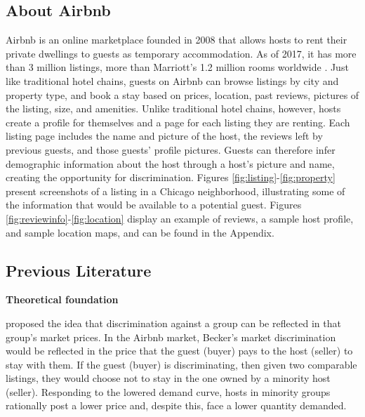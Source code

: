 \subsection{About Airbnb} 
\label{about}
Airbnb is an online marketplace founded in 2008 that allows hosts to rent their private dwellings to guests as temporary accommodation. As of 2017, it has more than 3 million listings, more than Marriott's 1.2 million rooms worldwide \citep{aboutus}. Just like traditional hotel chains, guests on Airbnb can browse listings by city and property type, and book a stay based on prices, location, past reviews, pictures of the listing, size, and amenities. Unlike traditional hotel chains, however, hosts create a profile for themselves and a page for each listing they are renting. Each listing page includes the name and picture of the host, the reviews left by previous guests, and those guests' profile pictures. Guests can therefore infer demographic information about the host through a host's picture and name, creating the opportunity for discrimination. Figures \ref{fig:listing}-\ref{fig:property} present screenshots of a listing in a Chicago neighborhood, illustrating some of the information that would be available to a potential guest. Figures \ref{fig:reviewinfo}-\ref{fig:location} display an example of reviews, a sample host profile, and sample location maps, and can be found in the Appendix.










\subsection{Previous Literature} 
\label{previous}

\textbf{Theoretical foundation}

\cite{becker} proposed the idea that discrimination against a group can be reflected in that group's market prices. In the Airbnb market, Becker's market discrimination would be reflected in the price that the guest (buyer) pays to the host (seller) to stay with them. If the guest (buyer) is discriminating, then given two comparable listings, they would choose not to stay in the one owned by a minority host (seller). Responding to the lowered demand curve, hosts in minority groups rationally post a lower price and, despite this, face a lower quantity demanded. 

